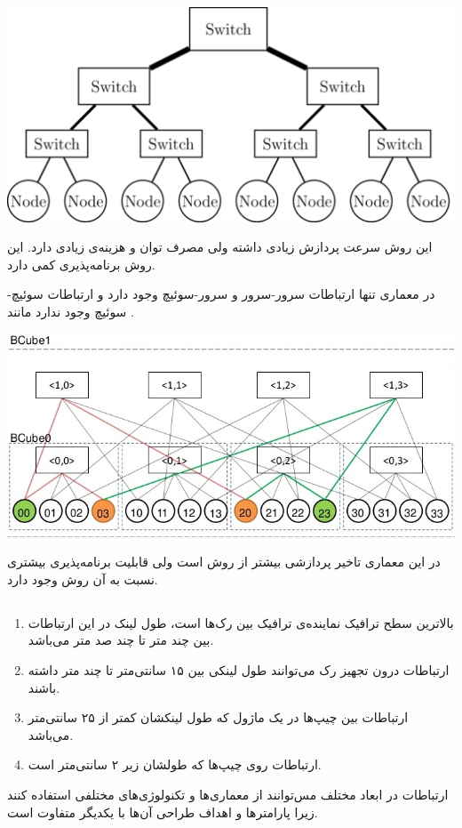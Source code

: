 \documentclass[paper=a4, fontsize=11pt]{article}
\numberwithin{equation}{section} %
\numberwithin{figure}{section} %
\numberwithin{table}{section} %
\begin{document}
\begin{center}
\includegraphics[scale=0.5]{fat_tree.png}
\end{center}

\par
این روش سرعت پردازش زیادی داشته ولی مصرف توان و هزینه‌ی زیادی دارد.
این روش برنامه‌پذیری کمی دارد.

\par
در معماری 
تنها ارتباطات سرور-سرور و سرور-سوئیچ وجود دارد و ارتباطات سوئیچ-سوئیچ وجود ندارد
مانند .

\begin{center}
\includegraphics[scale=0.5]{bcube.jpg}
\end{center}

\par
در این معماری تاخیر پردازشی بیشتر از روش 
است ولی قابلیت برنامه‌پذیری بیشتری نسبت به آن روش وجود دارد.

\subsection{}
\begin{enumerate}
\item
بالاترین سطح ترافیک نماینده‌ی ترافیک بین رک‌ها است،
طول لینک در این ارتباطات بین چند متر تا چند صد متر می‌باشد.
\item
ارتباطات درون تجهیز رک می‌توانند طول لینکی بین ۱۵ سانتی‌متر تا چند متر داشته باشند.
\item
ارتباطات بین چیپ‌ها در یک ماژول که طول لینکشان کمتر از ۲۵ سانتی‌متر می‌باشد.
\item
ارتباطات روی چیپ‌ها که طولشان زیر ۲ سانتی‌متر است.
\end{enumerate}
\par
ارتباطات در ابعاد مختلف مس‌توانند از معماری‌ها و تکنولوژی‌های مختلفی استفاده کنند
زیرا پارامترها و اهداف طراحی آن‌ها با یکدیگر متفاوت است.
\end{document}
